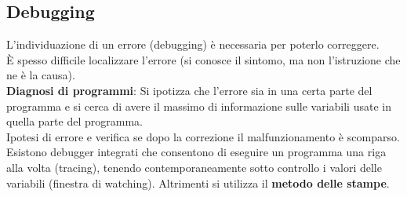 \documentclass[12pt]{report}
\begin{document}
	\subsection{Debugging}
	L'individuazione di un errore (debugging) è necessaria per poterlo correggere. \\
	È spesso difficile localizzare l'errore (si conosce il sintomo, ma non l'istruzione che ne è la causa). \\
	\textbf{Diagnosi di programmi}: Si ipotizza che l'errore sia in una certa parte del programma e si cerca di avere il massimo di informazione sulle variabili usate in quella parte del programma. \\
	Ipotesi di errore e verifica se dopo la correzione il malfunzionamento è scomparso. \\
	Esistono debugger integrati che consentono di eseguire un programma una riga alla volta (tracing), tenendo contemporaneamente sotto controllo i valori delle variabili (finestra di watching). Altrimenti si utilizza il \textbf{metodo delle stampe}.
\end{document}
